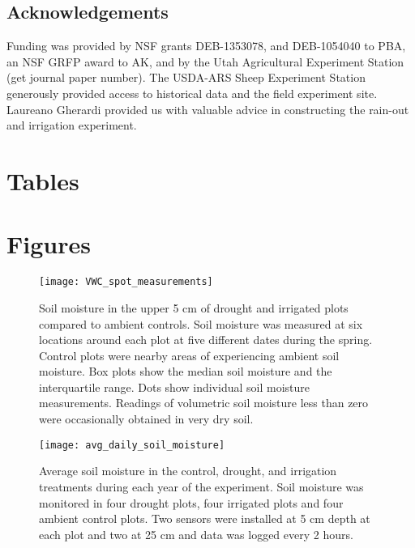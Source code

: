 \documentclass[11pt]{article}
\begin{document}
\begin{doublespacing}
\section*{Acknowledgements}

Funding was provided by NSF grants DEB-1353078, and DEB-1054040 to PBA, an NSF GRFP award to AK, and by the Utah Agricultural Experiment Station (get journal paper number). The USDA-ARS Sheep Experiment Station generously provided access to historical data and the field experiment site. Laureano Gherardi provided us with valuable advice in constructing the rain-out and irrigation experiment. 

\newpage




\end{doublespacing} 

\clearpage
\newpage

\section*{Tables}













\clearpage
\newpage


\section*{Figures}


\begin{figure}[!htbp]
	\centering
	\texttt{[image: VWC\_spot\_measurements]}
	\caption{Soil moisture in the upper 5 cm of drought and irrigated plots compared to ambient controls. Soil moisture was measured at six locations around each plot at five different dates during the spring. Control plots were nearby areas of experiencing ambient soil moisture. Box plots show the median soil moisture and the interquartile range.  Dots show individual soil moisture measurements. Readings of volumetric soil moisture less than zero were occasionally obtained in very dry soil.}
	\label{fig:spotVWC}
\end{figure}


\begin{figure}[!htbp]
	\centering
	\texttt{[image: avg\_daily\_soil\_moisture]}
	\caption{Average soil moisture in the control, drought, and irrigation treatments during each year of the experiment.  Soil moisture was monitored in four drought plots, four irrigated plots and four ambient control plots. Two sensors were installed at 5 cm depth at each plot and two at 25 cm and data was logged every 2 hours.}
	\label{fig:dailyVWC}
\end{figure}
\end{document}
